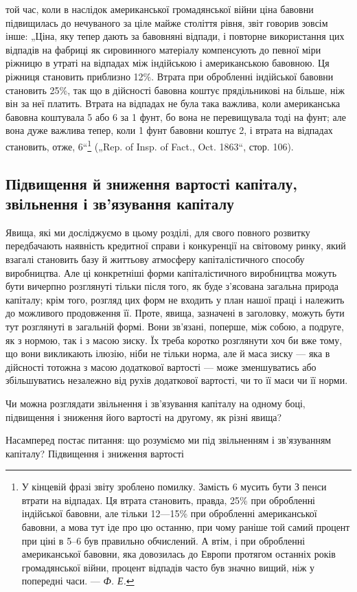 \parcont{}  %
той час, коли в наслідок американської громадянської війни ціна
бавовни підвищилась до нечуваного за ціле майже століття
рівня, звіт говорив зовсім інше: „Ціна, яку тепер дають за бавовняні
відпади, і повторне використання цих відпадів на
фабриці як сировинного матеріалу компенсують до певної міри
ріжницю в утраті на відпадах між індійською і американською
бавовною. Ця ріжниця становить приблизно 12\%. Втрата при
обробленні індійської бавовни становить 25\%, так що в дійсності
бавовна коштує прядільникові на  більше, ніж він за неї
платить. Втрата на відпадах не була така важлива, коли американська
бавовна коштувала 5 або 6 за 1 фунт, бо вона
не перевищувала тоді  на фунт; але вона дуже важлива
тепер, коли 1 фунт бавовни коштує 2, і втрата на відпадах
становить, отже, 6“\footnote{
У кінцевій фразі звіту зроблено помилку. Замість 6 мусить бути З
пенси втрати на відпадах. Ця втрата становить, правда, 25\% при обробленні
індійської бавовни, але тільки 12—15\% при обробленні американської бавовни,
а мова тут іде про цю останню, при чому раніше той самий процент при
ціні в 5--6 був правильно обчислений. А втім, і при обробленні американської
бавовни, яка довозилась до Европи протягом останніх років громадянської
війни, процент відпадів часто був значно вищий, ніж у попередні
часи. — \emph{Ф. Е.}
} („Rep. of Insp. of Fact., Oct.
1863“, стор. 106).

\subsection{Підвищення й зниження вартості капіталу, звільнення
і зв’язування капіталу}

Явища, які ми досліджуємо в цьому розділі, для свого повного
розвитку передбачають наявність кредитної справи і конкуренції
на світовому ринку, який взагалі становить базу й життьову атмосферу
капіталістичного способу виробництва. Але ці конкретніші
форми капіталістичного виробництва можуть бути вичерпно розглянуті
тільки після того, як буде з’ясована загальна природа
капіталу; крім того, розгляд цих форм не входить у план нашої
праці і належить до можливого продовження її. Проте, явища,
зазначені в заголовку, можуть бути тут розглянуті в загальній
формі. Вони зв’язані, поперше, між собою, а подруге, як
з нормою, так і з масою зиску. Їх треба коротко розглянути
хоч би вже тому, що вони викликають ілюзію, ніби не тільки
норма, але й маса зиску — яка в дійсності тотожна з масою
додаткової вартості — може зменшуватись або збільшуватись
незалежно від рухів додаткової вартості, чи то її маси чи її
норми.

Чи можна розглядати звільнення і зв’язування капіталу на
одному боці, підвищення і зниження його вартості на другому,
як різні явища?

Насамперед постає питання: що розуміємо ми під звільненням
і зв’язуванням капіталу? Підвищення і зниження вартості
\parbreak{}  %
